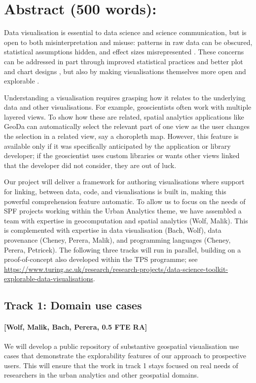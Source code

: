 \section*{Abstract (500 words):}

Data visualisation is essential to data science and science communication, but
is open to both misinterpretation and misuse: patterns in raw data can be
obscured, statistical assumptions hidden, and effect sizes misrepresented
\cite{weissgerber15}. These concerns can be addressed in part through improved
statistical practices and better plot and chart designs \cite{allen19}, but also
by making visualisations themselves more open and explorable
\cite{dragicevic19}.

Understanding a visualisation requires grasping how it relates to the underlying
data and other visualisations. For example, geoscientists often work with
multiple layered views. To show how these are related, spatial analytics
applications like GeoDa \cite{anselin06} can automatically select the relevant
part of one view as the user changes the selection in a related view, say a
choropleth map. However, this feature is available only if it was specifically
anticipated by the application or library developer; if the geoscientist uses
custom libraries or wants other views linked that the developer did not
consider, they are out of luck.

Our project will deliver a framework for authoring visualisations where support
for linking, between data, code, and visualisations is built in, making this
powerful comprehension feature automatic. To allow us to focus on the needs of
SPF projects working within the Urban Analytics theme, we have assembled a team
with expertise in geocomputation and spatial analytics (Wolf, Malik). This is
complemented with expertise in data visualisation (Bach, Wolf), data provenance
(Cheney, Perera, Malik), and programming languages (Cheney, Perera, Petricek).
The following three tracks will run in parallel, building on a proof-of-concept
also developed within the TPS programme; see
\url{https://www.turing.ac.uk/research/research-projects/data-science-toolkit-explorable-data-visualisations}.

\subsection*{Track 1: Domain use cases}

\paragraph{[Wolf, Malik, Bach, Perera, 0.5 FTE RA]} We will develop a public
repository of substantive geospatial visualisation use cases that demonstrate
the explorability features of our approach to prospective users. This will
ensure that the work in track 1 stays focused on real needs of researchers in
the urban analytics and other geospatial domains.

